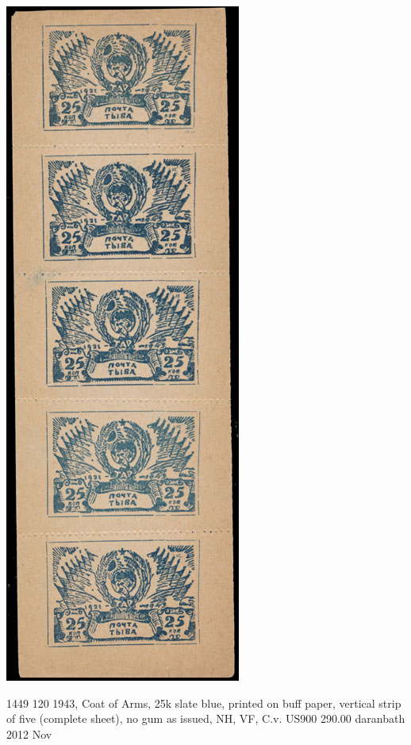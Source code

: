 \begin{marginfigure}
\centering
\includegraphics[width=.90\textwidth]{../tannu-tuva/1943-strip.jpg}

\caption{
1449	 120	
1943, Coat of Arms, 25k slate blue, printed on buff paper, vertical strip of five (complete sheet), no gum as issued, NH, VF, C.v. US900
290.00 daranbath 2012 Nov }
\end{marginfigure}



